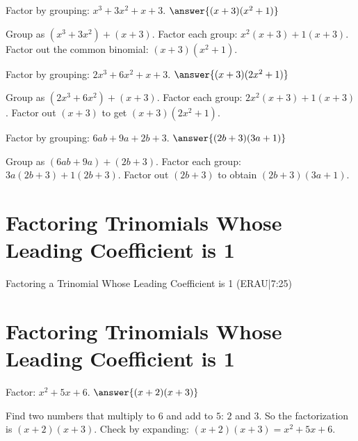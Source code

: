 \documentclass{ximera}
\begin{document}
\begin{problem}
Factor by grouping: \(x^3 + 3x^2 + x + 3\). $\answer{(x+3)(x^2+1)}$
\begin{feedback}
Group as \((x^3+3x^2)+(x+3)\). Factor each group: \(x^2(x+3)+1(x+3)\). Factor out the common binomial: \((x+3)(x^2+1)\).
\end{feedback}
\end{problem}

\begin{problem}
Factor by grouping: \(2x^3 + 6x^2 + x + 3\). $\answer{(x+3)(2x^2+1)}$
\begin{feedback}
Group as \((2x^3+6x^2)+(x+3)\). Factor each group: \(2x^2(x+3)+1(x+3)\). Factor out \((x+3)\) to get \((x+3)(2x^2+1)\).
\end{feedback}
\end{problem}

\begin{problem}
Factor by grouping: \(6ab + 9a + 2b + 3\). $\answer{(2b+3)(3a+1)}$
\begin{feedback}
Group as \((6ab+9a)+(2b+3)\). Factor each group: \(3a(2b+3)+1(2b+3)\). Factor out \((2b+3)\) to obtain \((2b+3)(3a+1)\).
\end{feedback}
\end{problem}


\section*{Factoring Trinomials Whose Leading Coefficient is 1}

Factoring a Trinomial Whose Leading Coefficient is 1 (ERAU|7:25)



\section*{Factoring Trinomials Whose Leading Coefficient is 1}

\begin{problem}
Factor: \(x^2 + 5x + 6\). $\answer{(x+2)(x+3)}$
\begin{feedback}
Find two numbers that multiply to \(6\) and add to \(5\): \(2\) and \(3\). So the factorization is \((x+2)(x+3)\). Check by expanding: \((x+2)(x+3)=x^2+5x+6\).
\end{feedback}
\end{problem}
\end{document}
